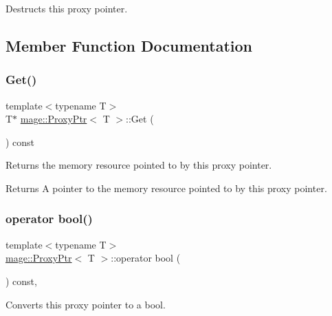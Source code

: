 Destructs this proxy pointer. 

\subsection{Member Function Documentation}
\mbox{\label{classmage_1_1_proxy_ptr_a9af6f8e3b1f1aa9d5b323ed01fb9b40d}} 
\subsubsection{\texorpdfstring{Get()}{Get()}}
{\footnotesize\ttfamily template$<$typename T$>$ \\
T$\ast$ \mbox{\hyperlink{classmage_1_1_proxy_ptr}{mage\+::\+Proxy\+Ptr}}$<$ T $>$\+::Get (\begin{DoxyParamCaption}{ }\end{DoxyParamCaption}) const\hspace{0.3cm}{\ttfamily [noexcept]}}

Returns the memory resource pointed to by this proxy pointer.

\begin{DoxyReturn}{Returns}
A pointer to the memory resource pointed to by this proxy pointer. 
\end{DoxyReturn}
\mbox{\label{classmage_1_1_proxy_ptr_ac1226dcf54a735bb5da12273c38e9b8f}} 
\subsubsection{\texorpdfstring{operator bool()}{operator bool()}}
{\footnotesize\ttfamily template$<$typename T$>$ \\
\mbox{\hyperlink{classmage_1_1_proxy_ptr}{mage\+::\+Proxy\+Ptr}}$<$ T $>$\+::operator bool (\begin{DoxyParamCaption}{ }\end{DoxyParamCaption}) const\hspace{0.3cm}{\ttfamily [explicit]}, {\ttfamily [noexcept]}}

Converts this proxy pointer to a {\ttfamily bool}. \mbox{\label{classmage_1_1_proxy_ptr_a14c1832a1f6b48c69337931d49bf3676}} 
